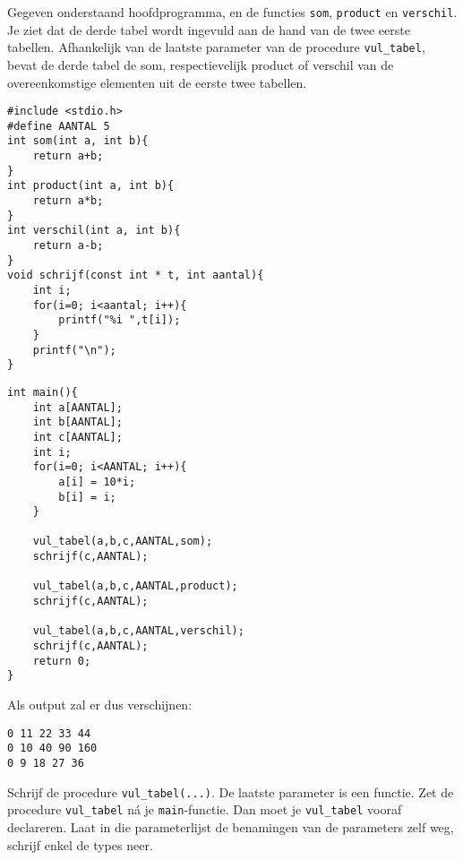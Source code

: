 \beginoef
Gegeven onderstaand hoofdprogramma, en de functies \verb}som}, \verb}product} en \verb}verschil}.
Je ziet dat de derde tabel wordt ingevuld aan de hand van de twee eerste tabellen. Afhankelijk van de 
laatste parameter van de procedure \verb}vul_tabel}, bevat de derde tabel de som, respectievelijk product of verschil van de overeenkomstige elementen
uit de eerste twee tabellen.
\begin{footnotesize}
\begin{minipage}[t]{9cm}
\begin{verbatim}
#include <stdio.h>
#define AANTAL 5
int som(int a, int b){
    return a+b;
}
int product(int a, int b){
    return a*b;
}
int verschil(int a, int b){
    return a-b;
}
void schrijf(const int * t, int aantal){	
    int i;
    for(i=0; i<aantal; i++){
        printf("%i ",t[i]);
    }
    printf("\n");
}
\end{verbatim}
\end{minipage}
\begin{minipage}[t]{8cm}
\begin{verbatim}
int main(){
    int a[AANTAL];
    int b[AANTAL];
    int c[AANTAL];
    int i;
    for(i=0; i<AANTAL; i++){
        a[i] = 10*i;
        b[i] = i;
    }
	
    vul_tabel(a,b,c,AANTAL,som);
    schrijf(c,AANTAL);
	
    vul_tabel(a,b,c,AANTAL,product);
    schrijf(c,AANTAL);
	
    vul_tabel(a,b,c,AANTAL,verschil);
    schrijf(c,AANTAL);
    return 0;
}
\end{verbatim}
\end{minipage}
\end{footnotesize} Als output zal er dus verschijnen:
\begin{verbatim}
0 11 22 33 44
0 10 40 90 160 
0 9 18 27 36 
\end{verbatim}
Schrijf de procedure \verb}vul_tabel(...)}. De laatste parameter is een functie. 
Zet de procedure \verb}vul_tabel} n\'a je \verb}main}-functie. Dan moet je \verb}vul_tabel}
vooraf declareren. Laat in die parameterlijst de benamingen van de parameters zelf weg, schrijf enkel de types neer.

\endoef

